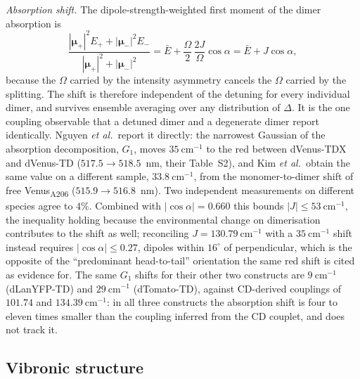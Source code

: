 \documentclass[journal=jpcbfk, manuscript=article, layout=twocolumn, doi=true]{achemso}
\begin{document}
\emph{Absorption shift.} The dipole-strength-weighted first moment of the dimer
absorption is
\begin{equation}
\frac{|\bm{\mu}_+|^2 E_+ + |\bm{\mu}_-|^2 E_-}{|\bm{\mu}_+|^2 + |\bm{\mu}_-|^2}
= \bar{E} + \frac{\Omega}{2}\,\frac{2J}{\Omega}\cos\alpha
= \bar{E} + J\cos\alpha ,
\label{eq:firstmoment}
\end{equation}
because the $\Omega$ carried by the intensity asymmetry cancels the $\Omega$
carried by the splitting. The shift is therefore independent of the detuning
for every individual dimer, and survives ensemble averaging over any
distribution of $\Delta$. It is the one coupling observable that a detuned
dimer and a degenerate dimer report identically. Nguyen \emph{et al.}\ report
it directly: the narrowest Gaussian of the absorption decomposition, $G_{1}$,
moves $35~\mathrm{cm^{-1}}$ to the red between dVenus-TDX and dVenus-TD
($517.5 \rightarrow 518.5$~nm, their Table~S2), and Kim \emph{et al.}\ obtain
the same value on a different sample, $33.8~\mathrm{cm^{-1}}$, from the
monomer-to-dimer shift of free Venus\textsubscript{A206}
($515.9 \rightarrow 516.8$~nm).\cite{kim2019venusa206} Two independent
measurements on different species agree to $4\%$. Combined with
$|\cos\alpha| = 0.660$ this bounds $|J| \le 53~\mathrm{cm^{-1}}$, the
inequality holding because the environmental change on dimerisation contributes
to the shift as well; reconciling $J = 130.79~\mathrm{cm^{-1}}$ with a
$35~\mathrm{cm^{-1}}$ shift instead requires $|\cos\alpha| \le 0.27$, dipoles
within $16^{\circ}$ of perpendicular, which is the opposite of the
``predominant head-to-tail'' orientation the same red shift is cited as
evidence for. The same $G_{1}$ shifts for their other two constructs are
$9~\mathrm{cm^{-1}}$ (dLanYFP-TD) and $29~\mathrm{cm^{-1}}$ (dTomato-TD),
against CD-derived couplings of $101.74$ and $134.39~\mathrm{cm^{-1}}$: in all
three constructs the absorption shift is four to eleven times smaller than the
coupling inferred from the CD couplet, and does not track it.

\subsection{Vibronic structure}
\end{document}
